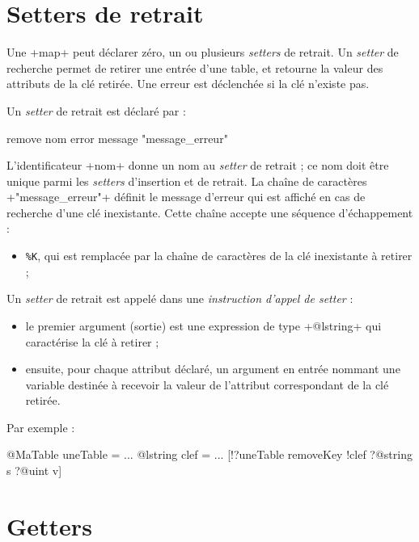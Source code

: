 \section{Setters de retrait}

Une \ggs+map+ peut déclarer zéro, un ou plusieurs \emph{setters} de retrait. Un \emph{setter} de recherche permet de retirer une entrée d'une table, et retourne la valeur des attributs de la clé retirée. Une erreur est déclenchée si la clé n'existe pas.


Un \emph{setter} de retrait est déclaré par :

\begin{galgas}
remove nom error message "message_erreur"
\end{galgas}

L'identificateur \ggs+nom+ donne un nom au \emph{setter} de retrait ; ce nom doit être unique parmi les \emph{setters} d'insertion et de retrait. La chaîne de caractères \ggs+"message_erreur"+ définit le message d'erreur qui est affiché en cas de recherche d'une clé inexistante. Cette chaîne accepte une séquence d'échappement :
\begin{itemize}
  \item \texttt{\%K}, qui est remplacée par la chaîne de caractères de la clé inexistante à retirer ;
\end{itemize}


Un \emph{setter} de retrait est appelé dans une \emph{instruction d'appel de setter} :
\begin{itemize}
  \item le premier argument (sortie) est une expression de type \ggs+@lstring+ qui caractérise la clé à retirer ;
  \item ensuite, pour chaque attribut déclaré, un argument en entrée nommant une variable destinée à recevoir la valeur de l'attribut correspondant de la clé retirée.
\end{itemize}

Par exemple :
\begin{galgas}
@MaTable uneTable = {}
...
@lstring clef = ...
[!?uneTable removeKey !clef ?@string s ?@uint v]
\end{galgas}

\section{Getters}

